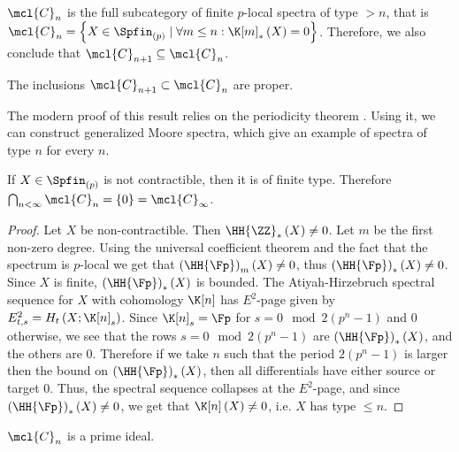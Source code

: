 \begin{corollary}
	$\mcl{C}_n$ is the full subcategory of finite $p$-local spectra of type $> n$, that is $\mcl{C}_n = \left\{ X \in \Spfin_{\left(p\right)} \mid \forall m \leq n: \K[m]_*\left(X\right) = 0 \right\}$.
	Therefore, we also conclude that $\mcl{C}_{n+1} \subseteq \mcl{C}_n$.
\end{corollary}

\begin{proposition}
	The inclusions $\mcl{C}_{n+1} \subset \mcl{C}_n$ are proper.
\end{proposition}

\begin{remark}
	The modern proof of this result relies on the periodicity theorem \cite[1.5.4]{Rav92}.
	Using it, we can construct generalized Moore spectra, which give an example of spectra of type $n$ for every $n$.
\end{remark}

\begin{proposition}
	If $X \in \Spfin_{\left(p\right)}$ is not contractible, then it is of finite type.
	Therefore $\bigcap_{n < \infty} \mcl{C}_n = \left\{0\right\} = \mcl{C}_\infty$.
\end{proposition}

\begin{proof}
	Let $X$ be non-contractible.
	Then $\HH{\ZZ}_*\left(X\right) \neq 0$.
	Let $m$ be the first non-zero degree.
	Using the universal coefficient theorem and the fact that the spectrum is $p$-local we get that $\left(\HH{\Fp}\right)_m\left(X\right) \neq 0$, thus $\left(\HH{\Fp}\right)_*\left(X\right) \neq 0$.
	Since $X$ is finite, $\left(\HH{\Fp}\right)_*\left(X\right)$ is bounded.
	The Atiyah-Hirzebruch spectral sequence for $X$ with cohomology $\K[n]$ has $E^2$-page given by
	$
	E_{t,s}^2
	= 
	H_t\left(X; \K[n]_s\right)
	$.
	Since $\K[n]_s = \Fp$ for $s = 0 \mod 2\left(p^n-1\right)$ and $0$ otherwise,
	we see that the rows $s = 0 \mod 2\left(p^n-1\right)$ are $\left(\HH{\Fp}\right)_*\left(X\right)$, and the others are $0$.
	Therefore if we take $n$ such that the period $2\left(p^n-1\right)$ is larger then the bound on $\left(\HH{\Fp}\right)_*\left(X\right)$, then all differentials have either source or target $0$.
	Thus, the spectral sequence collapses at the $E^2$-page, and since $\left(\HH{\Fp}\right)_*\left(X\right) \neq 0$, we get that $\K[n]\left(X\right) \neq 0$, i.e. $X$ has type $\leq n$.
\end{proof}

\begin{proposition}
	$\mcl{C}_n$ is a prime ideal.
\end{proposition}

